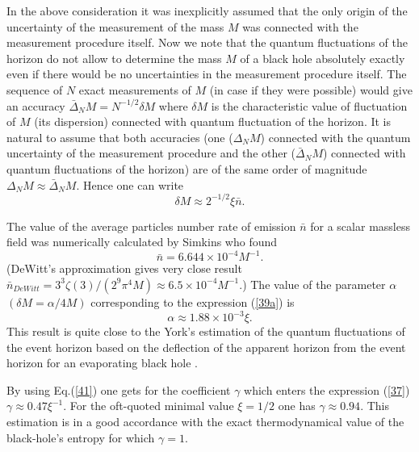 \documentclass[superscriptaddress,showpacs,preprintnumbers,amsmath,amssymb,
nofootinbib,twocolumn,aps,prd,10pt]{revtex4-1}
\begin{document}
In the above consideration it was inexplicitly assumed that the only origin
of the uncertainty of the measurement of the mass $M$ was connected with
the measurement procedure itself.  Now we note
that the quantum fluctuations of the horizon do not allow
to determine the mass $M$ of a black hole absolutely exactly even if there
would be no uncertainties in the measurement procedure itself.
The sequence of $N$ exact measurements of $M$ (in case if they
were possible) would give an accuracy
$\bar{\Delta}_N M =N^{-1/2}\delta M$ where $\delta M$
is the characteristic value of fluctuation of $M$ (its dispersion) connected
with quantum fluctuation of the horizon.
It is natural to assume that both accuracies (one ($\Delta _N M$) connected
with
the quantum uncertainty of the measurement procedure and the other
($\bar{\Delta}_N M$) connected
with quantum fluctuations of the horizon) are of the same order
of magnitude $\Delta _N M\approx \bar{\Delta}_N M$. Hence one can write
\begin{equation}
\delta M \approx 2^{-1/2}\xi \bar{n}. \label{39}
\end{equation}

The value of the average particles number rate of emission $\bar{n}$
for a scalar massless
field was numerically calculated by Simkins \cite{Simk:86} who found
\begin{equation}
\bar{n}=6.644\times 10^{-4}M^{-1} .\label{39a}
\end{equation}
(DeWitt's approximation gives very close result
$\bar{n}_{DeWitt}= 3^3 \zeta (3)/(2^9\pi ^4 M)
\approx 6.5\times 10^{-4}M^{-1}$.) The value of the parameter
$\alpha$ $(\delta M=\alpha /4M)$ corresponding
to the expression (\ref{39a}) is
\begin{equation}
\alpha \approx 1.88\times 10^{-3}\xi .\label{41}
\end{equation}
This result is quite close to the York's estimation of
the quantum fluctuations of the  event horizon based on the  deflection
of the  apparent horizon  from the  event horizon  for an  evaporating
black hole  \cite{York:84}.

By using Eq.(\ref{41})  one gets for  the coefficient $\gamma$  which enters
the
expression  (\ref{37})  $\gamma   \approx   0.47\xi   ^{-1}$.  For    the
oft-quoted  minimal value $\xi =1/2$ one has $\gamma  \approx 0.94$. This
estimation  is   in    a  good    accordance    with      the    exact
thermodynamical   value  of   the black-hole's entropy for which  $\gamma
=1$.
\end{document}
